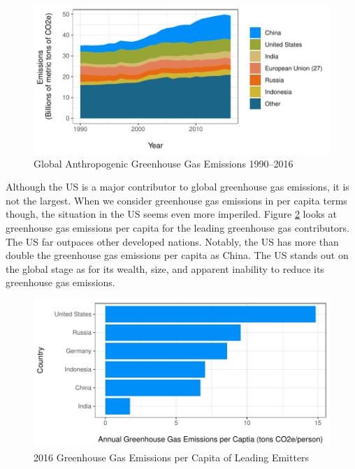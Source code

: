 \begin{figure}
\caption{Global Anthropogenic Greenhouse Gas Emissions 1990--2016 \label{global_ghg}}
\centering
\includegraphics[width=\textwidth]{figures/chapter1_figures/ghg_global.pdf}
\end{figure}

Although the US is a major contributor to global greenhouse gas emissions, it is not the largest. When we consider greenhouse gas emissions in per capita terms though, the situation in the US seems even more imperiled. Figure \ref{global_ghg_cap} looks at greenhouse gas emissions per capita for the leading greenhouse gas contributors. The US far outpaces other developed nations. Notably, the US has more than double the greenhouse gas emissions per capita as China. The US stands out on the global stage as for its wealth, size, and apparent inability to reduce its greenhouse gas emissions.

\begin{figure}
\caption{2016 Greenhouse Gas Emissions per Capita of Leading Emitters \label{global_ghg_cap}}
\centering
\includegraphics[scale=.9]{figures/chapter1_figures/ghg_cap.pdf}
\end{figure}



